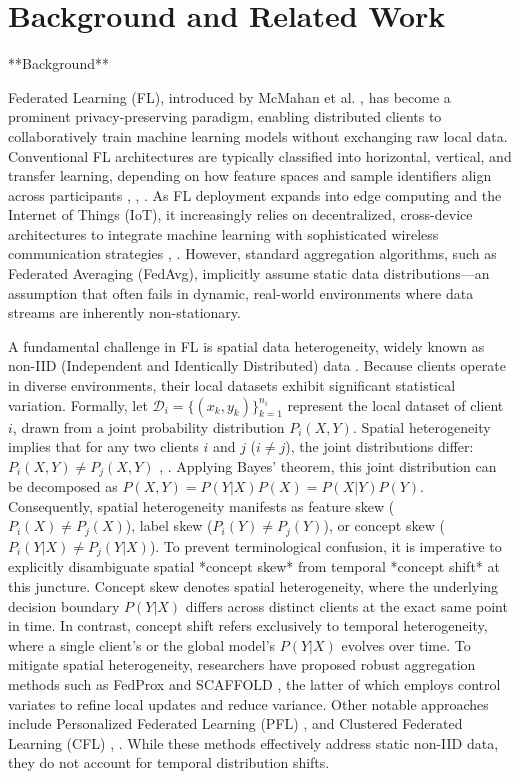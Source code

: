 \documentclass[journal]{IEEEtran}
\begin{document}
\section{Background and Related Work}
\label{sec:background}

**Background**

Federated Learning (FL), introduced by McMahan et al. \cite{Kairouz2020}, has become a prominent privacy-preserving paradigm, enabling distributed clients to collaboratively train machine learning models without exchanging raw local data. Conventional FL architectures are typically classified into horizontal, vertical, and transfer learning, depending on how feature spaces and sample identifiers align across participants \cite{NERGZ2022}, \cite{paper801}, \cite{paper802}. As FL deployment expands into edge computing and the Internet of Things (IoT), it increasingly relies on decentralized, cross-device architectures to integrate machine learning with sophisticated wireless communication strategies \cite{Letaief2021}, \cite{paper803}. However, standard aggregation algorithms, such as Federated Averaging (FedAvg), implicitly assume static data distributions—an assumption that often fails in dynamic, real-world environments where data streams are inherently non-stationary.

A fundamental challenge in FL is spatial data heterogeneity, widely known as non-IID (Independent and Identically Distributed) data \cite{Deshwal2025}. Because clients operate in diverse environments, their local datasets exhibit significant statistical variation. Formally, let $\mathcal{D}_i = \{(x_k, y_k)\}_{k=1}^{n_i}$ represent the local dataset of client $i$, drawn from a joint probability distribution $P_i(X, Y)$. Spatial heterogeneity implies that for any two clients $i$ and $j$ ($i \neq j$), the joint distributions differ: $P_i(X, Y) \neq P_j(X, Y)$ \cite{Gutierrez2025}, \cite{paper804}. Applying Bayes' theorem, this joint distribution can be decomposed as $P(X, Y) = P(Y|X)P(X) = P(X|Y)P(Y)$. Consequently, spatial heterogeneity manifests as feature skew ($P_i(X) \neq P_j(X)$), label skew ($P_i(Y) \neq P_j(Y)$), or concept skew ($P_i(Y|X) \neq P_j(Y|X)$). To prevent terminological confusion, it is imperative to explicitly disambiguate spatial *concept skew* from temporal *concept shift* at this juncture. Concept skew denotes spatial heterogeneity, where the underlying decision boundary $P(Y|X)$ differs across distinct clients at the exact same point in time. In contrast, concept shift refers exclusively to temporal heterogeneity, where a single client's or the global model's $P(Y|X)$ evolves over time. To mitigate spatial heterogeneity, researchers have proposed robust aggregation methods such as FedProx \cite{Cao2025} and SCAFFOLD \cite{Karimireddy2019a}, the latter of which employs control variates to refine local updates and reduce variance. Other notable approaches include Personalized Federated Learning (PFL) \cite{Tan2022}, \cite{paper805} and Clustered Federated Learning (CFL) \cite{Liu2025}, \cite{Yan2023a}. While these methods effectively address static non-IID data, they do not account for temporal distribution shifts.
\end{document}
